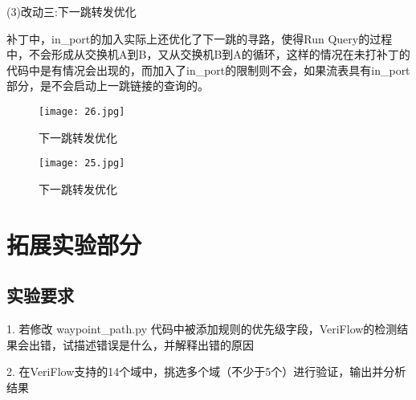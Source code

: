 \documentclass{xjtureport}
\begin{document}
(3)改动三:下一跳转发优化\par
补丁中，in\_port的加入实际上还优化了下一跳的寻路，使得Run Query的过程中，不会形成从交换机A到B，又从交换机B到A的循环，这样的情况在未打补丁的代码中是有情况会出现的，而加入了in\_port的限制则不会，如果流表具有in\_port部分，是不会启动上一跳链接的查询的。
 \begin{figure}[H]
	\centering
	\texttt{[image: 26.jpg]}
	\caption{下一跳转发优化}
 \end{figure}
 \begin{figure}[H]
 	\centering
 	\texttt{[image: 25.jpg]}
 	\caption{下一跳转发优化}
 \end{figure}
\section{拓展实验部分}
\subsection{实验要求}
1. 若修改 waypoint\_path.py 代码中被添加规则的优先级字段，VeriFlow的检测结果会出错，试描述错误是什么，并解释出错的原因\par
2. 在VeriFlow支持的14个域中，挑选多个域（不少于5个）进行验证，输出并分析结果\par
\end{document}
